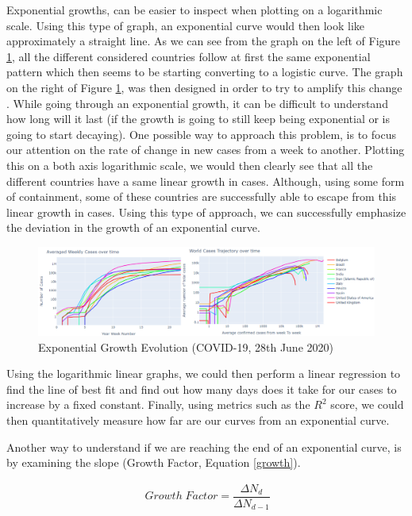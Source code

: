 Exponential growths, can be easier to inspect when plotting on a logarithmic scale. Using this type of graph, an exponential curve would then look like approximately a straight line. As we can see from the graph on the left of Figure \ref{exp}, all the different considered countries follow at first the same exponential pattern which then seems to be starting converting to a logistic curve. The graph on the right of Figure \ref{exp}, was then designed in order to try to amplify this change \cite{physics}. While going through an exponential growth, it can be difficult to understand how long will it last (if the growth is going to still keep being exponential or is going to start decaying). One possible way to approach this problem, is to focus our attention on the rate of change in new cases from a week to another. Plotting this on a both axis logarithmic scale, we would then clearly see that all the different countries have a same linear growth in cases. Although, using some form of containment, some of these countries are successfully able to escape from this linear growth in cases. Using this type of approach, we can successfully emphasize the deviation in the growth of an exponential curve.

\begin{figure}[ht!]%
    \centering
    \includegraphics[width=1\linewidth]{latex/images/logplot.pdf}
    \caption{Exponential Growth Evolution (COVID-19, 28th June 2020)}
    \label{exp}
\end{figure}

Using the logarithmic linear graphs, we could then perform a linear regression to find the line of best fit and find out how many days does it take for our cases to increase by a fixed constant. Finally, using metrics such as the $R^{2}$ score, we could then quantitatively measure how far are our curves from an exponential curve.

Another way to understand if we are reaching the end of an exponential curve, is by examining the slope (Growth Factor, Equation \ref{growth}).

\useshortskip
\begin{align}
\ Growth \; Factor = \dfrac{\Delta N_{d}}{\Delta N_{d-1}}
\label{growth}
\end{align}
\useshortskip

